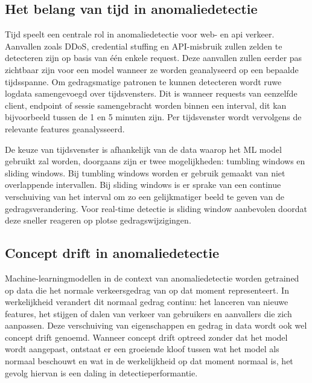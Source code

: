 \subsection{Het belang van tijd in anomaliedetectie}%
\label{subsec:belang-tijd}
Tijd speelt een centrale rol in anomaliedetectie voor web- en api verkeer. Aanvallen zoals DDoS, credential stuffing en API-misbruik zullen zelden te detecteren zijn op basis van één enkele request. Deze aanvallen zullen eerder pas zichtbaar zijn voor een model wanneer ze worden geanalyseerd op een bepaalde tijdsspanne\autocite{Schummer2024}.%
Om gedragsmatige patronen te kunnen detecteren wordt ruwe logdata samengevoegd over tijdsvensters. Dit is wanneer requests van eenzelfde client, endpoint of sessie samengebracht worden binnen een interval, dit kan bijvoorbeeld tussen de 1 en 5 minuten zijn. Per tijdsvenster wordt vervolgens de relevante features geanalysseerd\autocite{Sowmya2023}. %

De keuze van tijdsvenster is afhankelijk van de data waarop het ML model gebruikt zal worden, doorgaans zijn er twee mogelijkheden: tumbling windows en sliding windows. Bij tumbling windows worden er gebruik gemaakt van niet overlappende intervallen. Bij sliding windows is er sprake van een continue verschuiving van het interval om zo een gelijkmatiger beeld te geven van de gedragsverandering. Voor real-time detectie is sliding window aanbevolen doordat deze sneller reageren op plotse gedragswijzigingen\autocite{Schummer2024}. %

\subsection{Concept drift in anomaliedetectie}%
\label{subsec:concept-drift}

Machine-learningmodellen in de context van anomaliedetectie worden getrained op data die het normale verkeersgedrag van op dat moment representeert. In werkelijkheid verandert dit normaal gedrag continu: het lanceren van nieuwe features, het stijgen of dalen van verkeer van gebruikers en aanvallers die zich aanpassen. Deze verschuiving van eigenschappen en gedrag in data wordt ook wel concept drift genoemd. Wanneer concept drift optreed zonder dat het model wordt aangepast, ontstaat er een groeiende kloof tussen wat het model als normaal beschouwt en wat in de werkelijkheid op dat moment normaal is, het gevolg hiervan is een daling in detectieperformantie.   %


